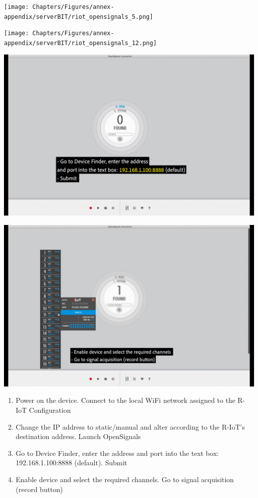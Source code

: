 \begin{center}
    \texttt{[image: Chapters/Figures/annex-appendix/serverBIT/riot\_opensignals\_5.png]}
    \caption{}
    \label{fig:riot_opensignals_5}
    
    \texttt{[image: Chapters/Figures/annex-appendix/serverBIT/riot\_opensignals\_12.png]}
    \caption{}
    \label{fig:riot_opensignals_12}
    
    \includegraphics[width=0.6\linewidth]{Chapters/Figures/annex-appendix/serverBIT/riot_opensignals_45.png}
    \label{fig:riot_opensignals_45}
    
    \includegraphics[width=0.6\linewidth]{Chapters/Figures/annex-appendix/serverBIT/riot_opensignals_71.png}
    \label{fig:riot_opensignals_71}
\end{center}

\begin{enumerate}
    \item Power on the device. Connect to the local WiFi network assigned to the R-IoT Configuration
    \item Change the IP address to static/manual and alter according to the R-IoT’s destination address. Launch OpenSignals
    \item Go to Device Finder, enter the address and port into the text box: 192.168.1.100:8888 (default). Submit
    \item Enable device and select the required channels. Go to signal acquisition (record button)
\end{enumerate}




